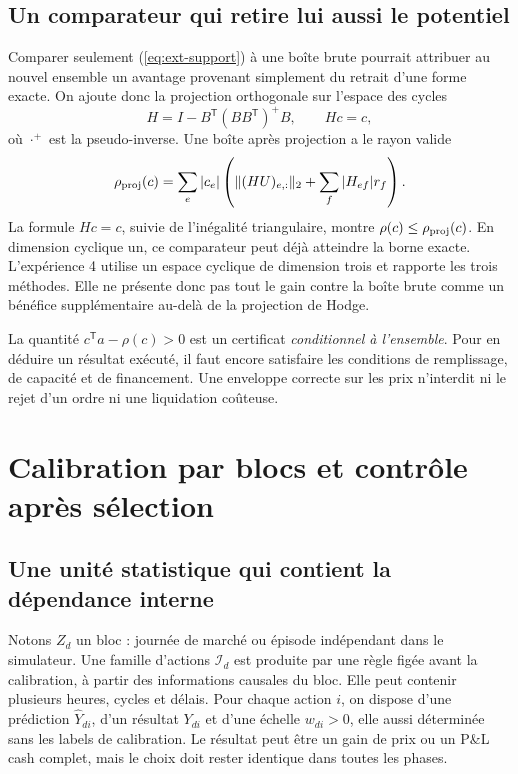 \subsection{Un comparateur qui retire lui aussi le potentiel}

Comparer seulement (\ref{eq:ext-support}) à une boîte brute pourrait attribuer au nouvel ensemble un avantage provenant simplement du retrait d'une forme exacte. On ajoute donc la projection orthogonale sur l'espace des cycles
\begin{equation}
 H=I-B^{\mathsf T}(BB^{\mathsf T})^+B,\qquad Hc=c,
 \label{eq:ext-projector}
\end{equation}
où \(\cdot^+\) est la pseudo-inverse. Une boîte après projection a le rayon valide
\begin{equation}
 \rho_{\rm proj}(c)=\sum_e |c_e|
 \left(\lVert(HU)_{e,:}\rVert_2+\sum_f|H_{ef}|r_f\right).
 \label{eq:ext-projbox}
\end{equation}
La formule \(Hc=c\), suivie de l'inégalité triangulaire, montre \(\rho(c)\le\rho_{\rm proj}(c)\). En dimension cyclique un, ce comparateur peut déjà atteindre la borne exacte. L'expérience 4 utilise un espace cyclique de dimension trois et rapporte les trois méthodes. Elle ne présente donc pas tout le gain contre la boîte brute comme un bénéfice supplémentaire au-delà de la projection de Hodge.

La quantité \(c^{\mathsf T}a-\rho(c)>0\) est un certificat \emph{conditionnel à l'ensemble}. Pour en déduire un résultat exécuté, il faut encore satisfaire les conditions de remplissage, de capacité et de financement. Une enveloppe correcte sur les prix n'interdit ni le rejet d'un ordre ni une liquidation coûteuse.

\section{Calibration par blocs et contrôle après sélection}
\label{sec:ext-inference}

\subsection{Une unité statistique qui contient la dépendance interne}

Notons \(Z_d\) un bloc : journée de marché ou épisode indépendant dans le simulateur. Une famille d'actions \(\mathcal I_d\) est produite par une règle figée avant la calibration, à partir des informations causales du bloc. Elle peut contenir plusieurs heures, cycles et délais. Pour chaque action \(i\), on dispose d'une prédiction \(\widehat Y_{di}\), d'un résultat \(Y_{di}\) et d'une échelle \(w_{di}>0\), elle aussi déterminée sans les labels de calibration. Le résultat peut être un gain de prix ou un P\&L cash complet, mais le choix doit rester identique dans toutes les phases.

